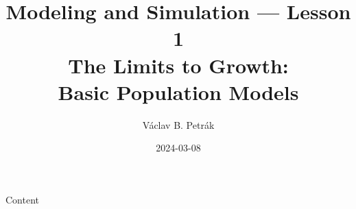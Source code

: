 \documentclass[11pt]{beamer}
\title{Modeling and Simulation --- Lesson 1\\
\textbf{The Limits to Growth:\\
Basic Population Models}}
\author{Václav B. Petrák}
\institute{Faculty of Biomedical Engineering\\
Czech Technical University}
\date{2024-03-08}
\begin{document}
\begin{frame}
  \titlepage
\end{frame}

\begin{frame}{Content}
    \tableofcontents 
\end{frame}

 
 
 

\end{document}
